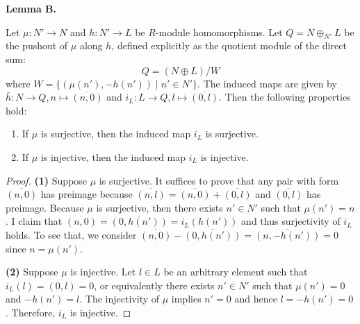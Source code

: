 \documentclass[12pt, a4paper]{article}
\theoremstyle{remark}
\newenvironment{lemma}[1]{
    \noindent \textbf{Lemma #1.} \itshape
}{
    \vspace{1em}
}
\begin{document}
\begin{lemma}{B}
Let $\mu: N' \to N$ and $h: N' \to L$ be $R$-module homomorphisms. Let $Q = N \oplus_{N'} L$ be the pushout of $\mu$ along $h$, defined explicitly as the quotient module of the direct sum:
\[ Q = (N \oplus L) / W \]
where $W = \{(\mu(n'), -h(n')) \mid n' \in N'\}$. The induced maps are given by $\bar{h}: N \to Q, n \mapsto \overline{(n, 0)}$ and $i_L: L \to Q, l \mapsto \overline{(0, l)}$. Then the following properties hold:
\begin{enumerate}
    \item If $\mu$ is surjective, then the induced map $i_L$ is surjective.
    \item If $\mu$ is injective, then the induced map $i_L$ is injective.
\end{enumerate}
\end{lemma}
\begin{proof}
\textbf{(1)} Suppose $\mu$ is surjective. It suffices to prove that any pair with form $\overline{(n,0)}$ has preimage because $\overline{(n,l)} = \overline{(n,0)}+\overline{(0,l)}$ and $\overline{(0,l)}$ has preimage.
Because $\mu$ is surjective, then there exists $n'\in N'$ such that $\mu(n')=n$. I claim that $\overline{(n,0)} = \overline{(0,h(n'))}= i_L(h(n'))$ and thus surjectivity of $i_L$ holds.
To see that, we consider $\overline{(n,0)}-\overline{(0,h(n'))} = \overline{(n,-h(n'))}=0$ since $n=\mu(n')$.

\textbf{(2)} Suppose $\mu$ is injective. Let $l\in L$ be an arbitrary element such that $i_L(l)= \overline{(0,l)}=0$, or equivalently there exists $n'\in N'$ such that $\mu(n')=0$ and $-h(n')=l$.
The injectivity of $\mu$ implies $n'=0$ and hence $l=-h(n')=0$. Therefore, $i_L$ is injective.
\end{proof}
\end{document}
